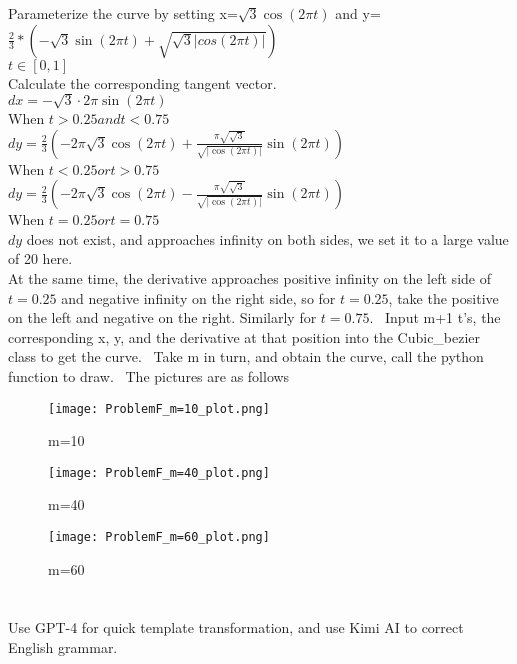 \documentclass[a4paper]{article}
\begin{document}
    Parameterize the curve by setting x=$\sqrt{3}\cos(2\pi t)$ and y=$\frac{2}{3}*(-\sqrt{3}\sin(2\pi t)+\sqrt{\sqrt{3}|cos(2\pi t)|})$ \\
    $t \in [0,1]$ \\
    Calculate the corresponding tangent vector. \\
    $dx=-\sqrt{3} \cdot 2\pi\sin(2\pi t)$ \\
    When $t>0.25 and t<0.75$ \\
    $dy = \frac{2}{3} \left( -2\pi\sqrt{3}\cos(2\pi t) + \frac{\pi\sqrt{\sqrt{3}}}{\sqrt{|\cos(2\pi t)|}}\sin(2\pi t) \right)$ \\
    When $t<0.25 or t>0.75$ \\
    $dy = \frac{2}{3} \left( -2\pi\sqrt{3}\cos(2\pi t) - \frac{\pi\sqrt{\sqrt{3}}}{\sqrt{|\cos(2\pi t)|}}\sin(2\pi t) \right)$ \\
    When $t=0.25 or t=0.75$ \\
    $dy$ does not exist, and approaches infinity on both sides, we set it to a large value of 20 here. \\
    At the same time, the derivative approaches positive infinity on the left side of $t=0.25$ and negative infinity on the right side, so for $t=0.25$, take the positive on the left and negative on the right. Similarly for $t=0.75$. \
    Input m+1 t's, the corresponding x, y, and the derivative at that position into the Cubic\_bezier class to get the curve. \
    Take m in turn, and obtain the curve, call the python function to draw. \
    The pictures are as follows \
    \begin{figure}[H]
    \centering
    \texttt{[image: ProblemF\_m=10\_plot.png]}
    \caption{m=10}
    \label{fig:example}
    \end{figure}
    \begin{figure}[H]
    \centering
    \texttt{[image: ProblemF\_m=40\_plot.png]}
    \caption{m=40}
    \label{fig:example}
    \end{figure}
    \begin{figure}[H]
    \centering
    \texttt{[image: ProblemF\_m=60\_plot.png]}
    \caption{m=60}
    \label{fig:example}
    \end{figure}
    
    \section*{  }
    Use GPT-4 for quick template transformation, and use Kimi AI to correct English grammar.
    
    
\end{document}
